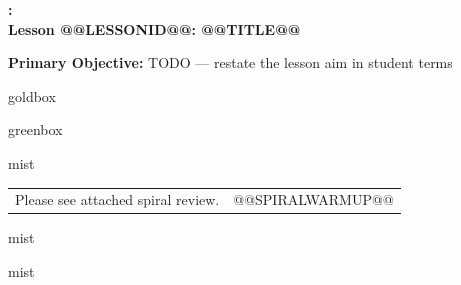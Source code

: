 \documentclass[10pt]{article}
\makeatletter
\newcommand{\LessonNumberName}{Lesson @@LESSONID@@: @@TITLE@@}
\makeatother
\begin{document}
\begin{center}
    {\Large\bfseries \CourseName: \SchoolYear \\
    {\small\bfseries \UnitNumberName \LessonNumberName}}
\end{center}

\begin{tcolorbox}[colback=mist, colframe=royal, boxrule=0.9pt, arc=2mm,
    left=2mm, right=2mm, top=1.5mm, bottom=1.5mm]
    \textbf{Primary Objective:} TODO --- restate the lesson aim in student terms
\end{tcolorbox}

\renewcommand{\arraystretch}{1.6}
\begin{skillbox}{goldbox}
\end{skillbox}

\begin{skillbox}{greenbox}
\end{skillbox}

\begin{fixedskillbox}{mist}
    \begin{tabularx}{\linewidth}{@{}X c@{}}
        \begin{minipage}[t]{0.55\linewidth}\vspace{0pt}
            Please see attached spiral review.  %
        \end{minipage}
        &
        \begin{minipage}[t]{0.38\linewidth}\vspace{0pt}\centering
@@SPIRALWARMUP@@
        \end{minipage}
    \end{tabularx}
\end{fixedskillbox}

\begin{skillbox}[Hook]{mist}
\end{skillbox}

\begin{skillbox}[Lesson]{mist}
\end{skillbox}
\end{document}
